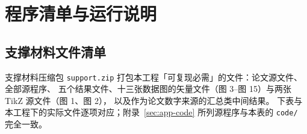 
\section{程序清单与运行说明}

\subsection{支撑材料文件清单}

支撑材料压缩包 \texttt{support.zip} 打包本工程「可复现必需」的文件：论文源文件、全部源程序、
五个结果文件、十三张数据图的矢量文件（图 3--图 15）与两张 TikZ 源文件（图 1、图 2），
以及作为论文数字来源的汇总类中间结果。
下表与本工程下的实际文件逐项对应；附录~\ref{sec:app-code} 所列源程序与本表的 \texttt{code/} 完全一致。

